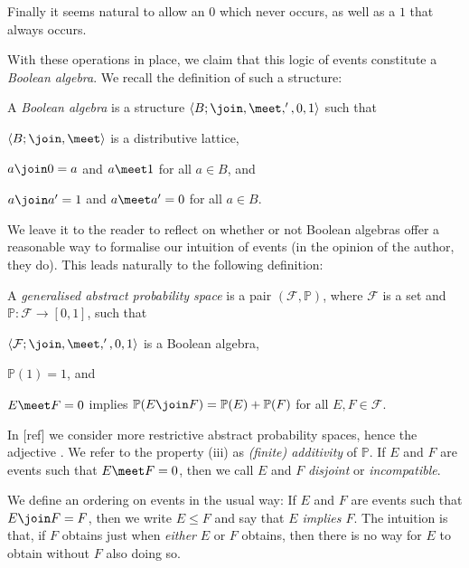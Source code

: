 \documentclass[article, a4paper, 11pt, oneside]{memoir}
\numberwithin{equation}{chapter}
\newcommand{\calF}{\mathcal{F}}
\renewcommand{\P}{\mathbb{P}}
\begin{document}
Finally it seems natural to allow an  $0$ which never occurs, as well as a  $1$ that always occurs.

With these operations in place, we claim that this logic of events constitute a \emph{Boolean algebra}. We recall the definition of such a structure:

\begin{definition}
    A \emph{Boolean algebra} is a structure $\langle B; \join, \meet, ', 0, 1 \rangle$ such that
    \begin{enumdef}
        \item $\langle B; \join, \meet \rangle$ is a distributive lattice,
        \item $a \join 0 = a$ and $a \meet 1$ for all $a \in B$, and
        \item $a \join a' = 1$ and $a \meet a' = 0$ for all $a \in B$.
    \end{enumdef}
\end{definition}
%
We leave it to the reader to reflect on whether or not Boolean algebras offer a reasonable way to formalise our intuition of events (in the opinion of the author, they do). This leads naturally to the following definition:

\begin{definition}
    A \emph{generalised abstract probability space} is a pair $(\calF, \P)$, where $\calF$ is a set and $\P \colon \calF \to [0,1]$, such that
    \begin{enumdef}
        \item $\langle \calF; \join, \meet, ', 0, 1 \rangle$ is a Boolean algebra,
        \item $\P(1) = 1$, and
        \item $E \meet F = 0$ implies $\P(E \join F) = \P(E) + \P(F)$ for all $E,F \in \calF$.
    \end{enumdef}
\end{definition}
%
In [ref] we consider more restrictive abstract probability spaces, hence the adjective . We refer to the property (iii) as \emph{(finite) additivity} of $\P$. If $E$ and $F$ are events such that $E \meet F = 0$, then we call $E$ and $F$ \emph{disjoint} or \emph{incompatible}.

We define an ordering on events in the usual way: If $E$ and $F$ are events such that $E \join F = F$, then we write $E \leq F$ and say that \emph{$E$ implies $F$}. The intuition is that, if $F$ obtains just when \emph{either} $E$ or $F$ obtains, then there is no way for $E$ to obtain without $F$ also doing so.
\end{document}
